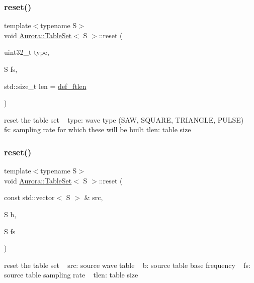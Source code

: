 \subsubsection{\texorpdfstring{reset()}{reset()}\hspace{0.1cm}{\footnotesize\ttfamily [1/4]}}
{\footnotesize\ttfamily template$<$typename S$>$ \\
void \hyperlink{class_aurora_1_1_table_set}{Aurora\+::\+Table\+Set}$<$ S $>$\+::reset (\begin{DoxyParamCaption}\item[{uint32\+\_\+t}]{type,  }\item[{S}]{fs,  }\item[{std\+::size\+\_\+t}]{len = {\ttfamily \hyperlink{namespace_aurora_a14dabfd9feedfa09c0e6f86d2627f006}{def\+\_\+ftlen}} }\end{DoxyParamCaption})\hspace{0.3cm}{\ttfamily [inline]}}

reset the table set ~\newline
type\+: wave type (S\+AW, S\+Q\+U\+A\+RE, T\+R\+I\+A\+N\+G\+LE, P\+U\+L\+SE) ~\newline
fs\+: sampling rate for which these will be built tlen\+: table size \mbox{\label{class_aurora_1_1_table_set_afec852dca45285ec57b6a4a97dffac36}} 
\subsubsection{\texorpdfstring{reset()}{reset()}\hspace{0.1cm}{\footnotesize\ttfamily [2/4]}}
{\footnotesize\ttfamily template$<$typename S$>$ \\
void \hyperlink{class_aurora_1_1_table_set}{Aurora\+::\+Table\+Set}$<$ S $>$\+::reset (\begin{DoxyParamCaption}\item[{const std\+::vector$<$ S $>$ \&}]{src,  }\item[{S}]{b,  }\item[{S}]{fs }\end{DoxyParamCaption})\hspace{0.3cm}{\ttfamily [inline]}}

reset the table set ~\newline
src\+: source wave table ~\newline
b\+: source table base frequency ~\newline
fs\+: source table sampling rate ~\newline
tlen\+: table size \mbox{\label{class_aurora_1_1_table_set_ac2c945c49d53f60fd909dc771a6ff7e5}} 
